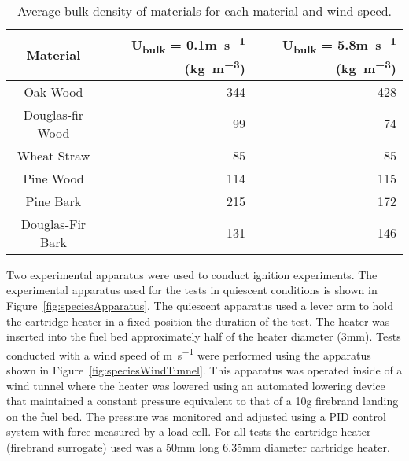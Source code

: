         \begin{table*}[hpbt]
        \caption{Average bulk density of materials for each material and wind speed.}
        \centering
        \begin{tabular}{crr}
            Material & U\textsubscript{bulk} = 0.1\si{\meter\per\second} (\si{\kilogram\per\cubic\meter})& U\textsubscript{bulk} = 5.8\si{\meter\per\second} (\si{\kilogram\per\cubic\meter})\\
            \hline
            Oak Wood         & 344 & 428 \\
            Douglas-fir Wood & 99  & 74 \\
            Wheat Straw      & 85  & 85 \\
            Pine Wood        & 114 & 115 \\
            Pine Bark        & 215 & 172 \\
            Douglas-Fir Bark & 131 & 146  
        \end{tabular}
        \label{tab:composition}
    \end{table*}
    Two experimental apparatus were used to conduct ignition experiments. The experimental apparatus used for the tests in quiescent conditions is shown in Figure~\ref{fig:speciesApparatus}. The quiescent apparatus used a lever arm to hold the cartridge heater in a fixed position the duration of the test. The heater was inserted into the fuel bed approximately half of the heater diameter (3\si{\milli\meter}). Tests conducted with a wind speed of \si{\meter\per\second} were performed using the apparatus shown in Figure~\ref{fig:speciesWindTunnel}. This apparatus was operated inside of a wind tunnel where the heater was lowered using an automated lowering device that maintained a constant pressure equivalent to that of a 10\si{\gram} firebrand landing on the fuel bed. The pressure was monitored and adjusted using a PID control system with force measured by a load cell. For all tests the cartridge heater (firebrand surrogate) used was a 50\si{\milli\meter} long 6.35\si{\milli\meter} diameter cartridge heater.
